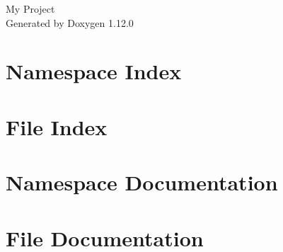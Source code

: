 \documentclass[twoside]{book}
\newcommand{\+}{\discretionary{\mbox{\scriptsize$\hookleftarrow$}}{}{}}
\newcommand{\clearemptydoublepage}{%
    \newpage{\pagestyle{empty}\cleardoublepage}%
  }
\begin{document}
  \raggedbottom
    \hypersetup{pageanchor=false,
                bookmarksnumbered=true,
                pdfencoding=unicode
               }
  \begin{titlepage}
  \vspace*{7cm}
  \begin{center}%
  {\Large My Project}\\
  \vspace*{1cm}
  {\large Generated by Doxygen 1.12.0}\\
  \end{center}
  \end{titlepage}
  \clearemptydoublepage
  \tableofcontents
  \clearemptydoublepage
  \hypersetup{pageanchor=true}
\chapter{Namespace Index}

\chapter{File Index}

\chapter{Namespace Documentation}

\chapter{File Documentation}


  \backmatter
  \newpage
  \clearemptydoublepage
  \printindex
\end{document}
